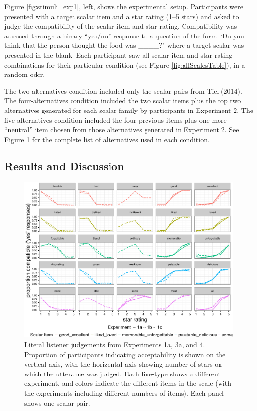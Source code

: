 \documentclass[10pt, letterpaper]{article}
\newenvironment{CodeChunk}{}{}
\begin{document}
Figure \ref{fig:stimuli_exp1}, left, shows the experimental setup.
Participants were presented with a target scalar item and a star rating
(1--5 stars) and asked to judge the compatibility of the scalar item and
star rating. Compatibility was assessed through a binary ``yes/no''
response to a question of the form ``Do you think that the person
thought the food was \_\_\_\_?" where a target scalar was presented in
the blank. Each participant saw all scalar item and star rating
combinations for their particular condition (see Figure
\ref{fig:allScalesTable}), in a random oder.

The two-alternatives condition included only the scalar pairs from Tiel
(2014). The four-alternatives condition included the two scalar items
plus the top two alternatives generated for each scalar family by
participants in Experiment 2. The five-alternatives condition included
the four previous items plus one more ``neutral'' item chosen from those
alternatives generated in Experiment 2. See Figure 1 for the complete
list of alternatives used in each condition.

\subsection{Results and Discussion}\label{results-and-discussion}

\begin{CodeChunk}
\begin{figure}[t]

{\centering \includegraphics{figs/exp1Plots-1} 

}

\caption[Literal listener judgements from Experiments 1a, 3a, and 4]{Literal listener judgements from Experiments 1a, 3a, and 4. Proportion of participants indicating acceptability is shown on the vertical axis, with the horizontal axis showing number of stars on which the utterance was judged. Each line-type shows a different experiment, and colors indicate the different items in the scale (with the experiments including different numbers of items).  Each panel shows one scalar pair.}\label{fig:exp1Plots}
\end{figure}
\end{CodeChunk}
\end{document}
